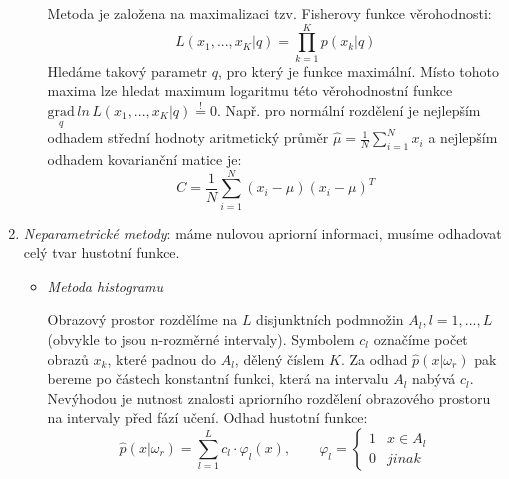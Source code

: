 \begin{enumerate}
\begin{itemize}
Metoda je založena na maximalizaci tzv. Fisherovy funkce věrohodnosti:
\begin{equation}
L(x_1, ..., x_K|q) = \displaystyle{\prod_{k=1}^K} p(x_k|q)
\end{equation}
Hledáme takový parametr $ q $, pro který je funkce maximální. Místo tohoto maxima lze hledat maximum logaritmu této věrohodnostní funkce $ \underset{q}{\mathrm{grad}} \, ln \, L(x_1,...,x_K|q) \overset{!}{=} 0 $. Např. pro normální rozdělení je nejlepším odhadem střední hodnoty aritmetický průměr $ \hat{\mu} = \frac{1}{N} \displaystyle{\sum_{i=1}^N} x_i $ a nejlepším odhadem kovarianční matice je: 
\begin{equation}
C = \frac{1}{N} \displaystyle{\sum_{i=1}^N} (x_i-\mu)(x_i-\mu)^T
\end{equation}
\end{itemize}
\item \textit{Neparametrické metody}: máme nulovou apriorní informaci, musíme odhadovat celý tvar hustotní funkce.
\begin{itemize}
\item \textit{Metoda histogramu}

Obrazový prostor rozdělíme na $ L $ disjunktních podmnožin $ A_l, l=1,...,L $ (obvykle to jsou n-rozměrné intervaly). Symbolem $ c_l $ označíme počet obrazů $ x_k $, které padnou do $ A_l $, dělený číslem $ K $. Za odhad $ \hat{p}(x|\omega_r) $ pak bereme po částech konstantní funkci, která na intervalu $ A_l $ nabývá $ c_l $. Nevýhodou je nutnost znalosti apriorního rozdělení obrazového prostoru na intervaly před fází učení. Odhad hustotní funkce:
\begin{equation}
\hat{p}(x|\omega_r) = \displaystyle{\sum_{l=1}^L c_l \cdot \varphi_l(x)}, \qquad \varphi_l = \begin{cases} 1 & x \in A_l \\ 0 & jinak \end{cases}
\end{equation}
\end{itemize}
\end{enumerate}

